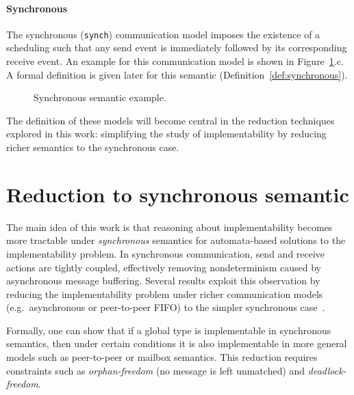 \paragraph{Synchronous}
The synchronous (\verb|synch|) communication model imposes 
the existence of a scheduling such that any send event is 
immediately followed by its corresponding receive event. 
An example for this communication model is shown in 
Figure~\ref{fig:sync}.c. A formal definition is given later 
for this semantic (Definition~\ref{def:synchronous}).

\begin{figure}[!ht]
    \centering
      \begin{msc}[draw frame=none, draw head=none, msc keyword=, 
                  head height=0px, label distance=0.5ex, 
                  foot height=0px, foot distance=0px]{}

          \nextlevel
      \end{msc}
  \caption{Synchronous semantic example.}
  \label{fig:sync}
\end{figure}

The definition of these models will become central in
the reduction techniques explored in this work: 
simplifying the study of implementability
by reducing richer semantics to the synchronous case.

\section{Reduction to synchronous semantic}
The main idea of this work is that reasoning about implementability 
becomes more tractable under \emph{synchronous} 
semantics for automata-based solutions to the implementability problem. 
In synchronous communication, send and receive actions 
are tightly coupled, effectively removing nondeterminism 
caused by asynchronous message buffering. Several results exploit this 
observation by reducing the implementability problem under richer 
communication models (e.g.\ asynchronous or peer-to-peer FIFO) to the 
simpler synchronous case~\cite{alur2005realizability,di2023partial}.

Formally, one can show that if a global type is implementable in 
synchronous semantics, then under certain conditions it is also 
implementable in more general models such as peer-to-peer or mailbox 
semantics. This reduction requires constraints such as 
\emph{orphan-freedom} (no message is left unmatched) and
\emph{deadlock-freedom}.  

